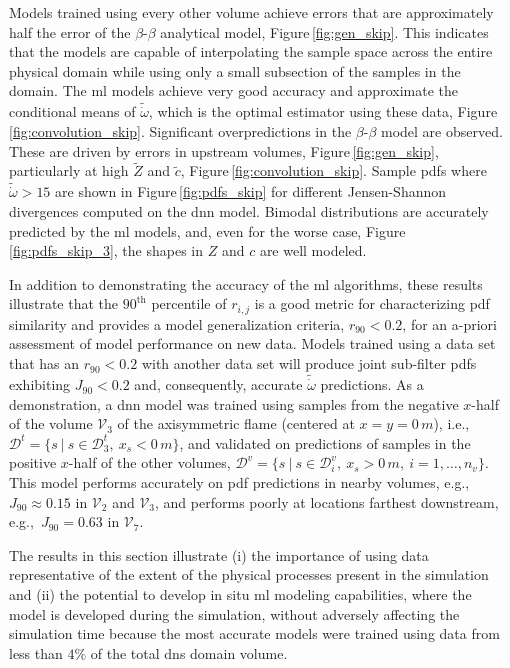 \documentclass[review]{elsarticle}
\newcommand{\wt}[1]{\widetilde{#1}}
\begin{document}
Models trained using every other volume achieve errors that are
approximately half the error of the $\beta$-$\beta$ analytical model,
Figure\,\ref{fig:gen_skip}. This indicates that the models are capable
of interpolating the sample space across the entire physical domain
while using only a small subsection of the samples in the domain. The
\gls{ml} models achieve very good accuracy and approximate the
conditional means of $\wt{\dot{\omega}}$, which is the optimal
estimator using these data,
Figure\,\ref{fig:convolution_skip}. Significant overpredictions in
the $\beta$-$\beta$ model are observed. These are driven by errors in
upstream volumes, Figure\,\ref{fig:gen_skip}, particularly at high
$\wt{Z}$ and $\wt{c}$, Figure\,\ref{fig:convolution_skip}. Sample \glspl{pdf}
where $\wt{\dot{\omega}} > 15$ are shown in
Figure\,\ref{fig:pdfs_skip} for different Jensen-Shannon divergences
computed on the \gls{dnn} model. Bimodal distributions are accurately
predicted by the \gls{ml} models, and, even for the worse
case, Figure\,\ref{fig:pdfs_skip_3}, the shapes in $Z$ and $c$ are well
modeled. 

In addition to demonstrating the accuracy of the \gls{ml}
algorithms, these results illustrate that the $90^{\text{th}}$
percentile of $r_{i,j}$ is a good metric for characterizing \gls{pdf}
similarity and provides a model generalization criteria,
$r_{90} < 0.2$, for an a-priori assessment of model performance on new
data. Models trained using a data set that has an $r_{90} < 0.2$ with
another data set will produce joint sub-filter \glspl{pdf} exhibiting
$J_{90} < 0.2$ and, consequently, accurate $\wt{\dot{\omega}}$
predictions. As a demonstration, a \gls{dnn} model was trained using
samples from the negative $x$-half of the volume $\mathcal{V}_3$ of
the axisymmetric flame (centered at $x=y=0\,\unit{m}$), i.e.,\
$\mathcal{D}^t = \{ s~|~s \in \mathcal{D}_3^t,~x_s < 0\,\unit{m}\}$, and
validated on predictions of samples in the positive $x$-half of the
other volumes,
$\mathcal{D}^v = \{ s~|~s \in \mathcal{D}_i^v,~x_s >
0\,\unit{m},~i=1,\dots, n_v\}$. This model performs accurately on
\gls{pdf} predictions in nearby volumes, e.g., $J_{90} \approx 0.15$ in
$\mathcal{V}_2$ and $\mathcal{V}_3$, and performs poorly at locations
farthest downstream, e.g.,\ $J_{90} = 0.63$ in $\mathcal{V}_7$.

The results in this section illustrate (i) the importance of using
data representative of the extent of the physical processes present in
the simulation and (ii) the potential to develop in situ \gls{ml}
modeling capabilities, where the model is developed during the
simulation, without adversely affecting the simulation time because
the most accurate models were trained using data from less than $4\%$
of the total \gls{dns} domain volume.
\end{document}
